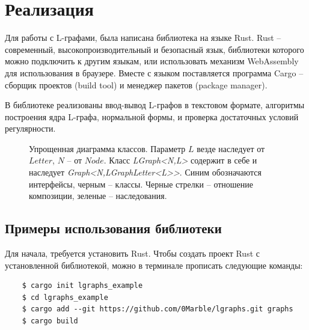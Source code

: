 \chapter{Реализация}

Для работы с L-графами, была написана библиотека на языке Rust. 
Rust -- современный, высокопроизводительный и безопасный язык, библиотеки которого
можно подключить к другим языкам, или использовать механизм WebAssembly для использования
в браузере. Вместе с языком поставляется программа Cargo -- сборщик проектов (build tool) и менеджер
пакетов (package manager). 

В библиотеке реализованы ввод-вывод L-графов в текстовом формате, 
алгоритмы построения ядра L-графа, нормальной формы, и проверка достаточных условий регулярности.

\begin{figure}[h]
    \centering
    
    \caption{
        Упрощенная диаграмма классов. Параметр $L$ везде наследует от $Letter$, $N$ -- от $Node$.
        Класс \emph{LGraph<N,L>} содержит в себе и наследует \emph{Graph<N,LGraphLetter<L>{}>}.
        Синим обозначаются интерфейсы, черным -- классы.
        Черные стрелки -- отношение композиции, зеленые -- наследования.
    }
    \label{arch-image}
\end{figure}

\section{Примеры использования библиотеки}

Для начала, требуется установить Rust. Чтобы создать проект Rust с установленной библиотекой,
можно в терминале прописать следующие команды:

\begin{verbatim}
    $ cargo init lgraphs_example
    $ cd lgraphs_example
    $ cargo add --git https://github.com/0Marble/lgraphs.git graphs
    $ cargo build
\end{verbatim}

